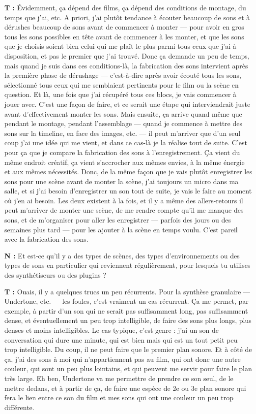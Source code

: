 ﻿\documentclass[12pt]{article}
\begin{document}
\textbf{T :} Évidemment, ça dépend des films, ça dépend des conditions de montage, du temps que j'ai, etc. A priori, j'ai plutôt tendance à écouter beaucoup de sons et à dérushes beaucoup de sons avant de commencer à monter — pour avoir en gros tous les sons possibles en tête avant de commencer à les monter, et que les sons que je choisis soient bien celui qui me plaît le plus parmi tous ceux que j'ai à disposition, et pas le premier que j'ai trouvé. Donc ça demande un peu de temps, mais quand je suis dans ces conditions-là, la fabrication des sons intervient après la première phase de dérushage — c'est-à-dire après avoir écouté tous les sons, sélectionné tous ceux qui me semblaient pertinents pour le film ou la scène en question. Et là, une fois que j'ai récupéré tous ces blocs, je vais commencer à jouer avec. C'est une façon de faire, et ce serait une étape qui interviendrait juste avant d'effectivement monter les sons. 
Mais ensuite, ça arrive quand même que pendant le montage, pendant l'assemblage — quand je commence à mettre des sons sur la timeline, en face des images, etc. — il peut m'arriver que d'un seul coup j'ai une idée qui me vient, et dans ce cas-là je la réalise tout de suite. C'est pour ça que je compare la fabrication des sons à l'enregistrement. Ça vient du même endroit créatif, ça vient s'accrocher aux mêmes envies, à la même énergie et aux mêmes nécessités. Donc, de la même façon que je vais plutôt enregistrer les sons pour une scène avant de monter la scène, j'ai toujours un micro dans ma salle, et si j'ai besoin d'enregistrer un son tout de suite, je vais le faire au moment où j'en ai besoin. Les deux existent à la fois, et il y a même des allers-retours il peut m'arriver de monter une scène, de me rendre compte qu'il me manque des sons, et de m'organiser pour aller les enregistrer — parfois des jours ou des semaines plus tard — pour les ajouter à la scène en temps voulu. C'est pareil avec la fabrication des sons. 

\textbf{N :} Et est-ce qu'il y a des types de scènes, des types d'environnements ou des types de sons en particulier qui reviennent régulièrement, pour lesquels tu utilises des synthétiseurs ou des plugins ? 

\textbf{T :} Ouais, il y a quelques trucs un peu récurrents. Pour la synthèse granulaire — Undertone, etc. — les foules, c'est vraiment un cas récurrent. Ça me permet, par exemple, à partir d'un son qui ne serait pas suffisamment long, pas suffisamment dense, et éventuellement un peu trop intelligible, de faire des sons plus longs, plus denses et moins intelligibles. Le cas typique, c'est genre : j'ai un son de conversation qui dure une minute, qui est bien mais qui est un tout petit peu trop intelligible. Du coup, il ne peut faire que le premier plan sonore. Et à côté de ça, j'ai des sons à moi qui n'appartiennent pas au film, qui ont donc une autre couleur, qui sont un peu plus lointains, et qui peuvent me servir pour faire le plan très large. Eh ben, Undertone va me permettre de prendre ce son seul, de le mettre dedans, et à partir de ça, de faire une espèce de 2e ou 3e plan sonore qui fera le lien entre ce son du film et mes sons qui ont une couleur un peu trop différente. 
\end{document}
